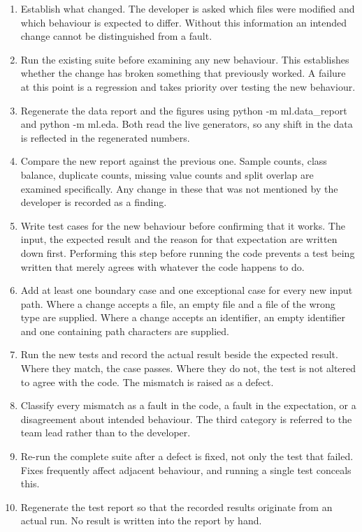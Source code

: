 \documentclass[11pt,a4paper]{article}
\begin{document}
\begin{enumerate}[leftmargin=*,itemsep=2pt]
  \item Establish what changed. The developer is asked which files were modified and which behaviour is expected to differ. Without this information an intended change cannot be distinguished from a fault.
  \item Run the existing suite before examining any new behaviour. This establishes whether the change has broken something that previously worked. A failure at this point is a regression and takes priority over testing the new behaviour.
  \item Regenerate the data report and the figures using python -m ml.data\_report and python -m ml.eda. Both read the live generators, so any shift in the data is reflected in the regenerated numbers.
  \item Compare the new report against the previous one. Sample counts, class balance, duplicate counts, missing value counts and split overlap are examined specifically. Any change in these that was not mentioned by the developer is recorded as a finding.
  \item Write test cases for the new behaviour before confirming that it works. The input, the expected result and the reason for that expectation are written down first. Performing this step before running the code prevents a test being written that merely agrees with whatever the code happens to do.
  \item Add at least one boundary case and one exceptional case for every new input path. Where a change accepts a file, an empty file and a file of the wrong type are supplied. Where a change accepts an identifier, an empty identifier and one containing path characters are supplied.
  \item Run the new tests and record the actual result beside the expected result. Where they match, the case passes. Where they do not, the test is not altered to agree with the code. The mismatch is raised as a defect.
  \item Classify every mismatch as a fault in the code, a fault in the expectation, or a disagreement about intended behaviour. The third category is referred to the team lead rather than to the developer.
  \item Re-run the complete suite after a defect is fixed, not only the test that failed. Fixes frequently affect adjacent behaviour, and running a single test conceals this.
  \item Regenerate the test report so that the recorded results originate from an actual run. No result is written into the report by hand.
\end{enumerate}
\end{document}
